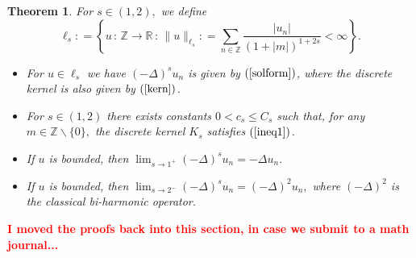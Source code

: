 \documentclass[final,1p,times]{elsarticle}
\def\ZZ{\mathbb Z} %
\def\RR{\mathbb R} %
\def\l{\left}
\def\r{\right}
\newcommand{\no}{\noindent}
\def\R#1{$(\ref{#1})$}
\newtheorem{theorem}{Theorem}
\theoremstyle{remark}
\theoremstyle{definition}
\newcommand{\josh}[1]{\textcolor{red}{\textbf{#1}}}
\begin{document}
\begin{theorem}
For $s\in (1,2),$ we define
$$\ell_{s}\mathrel{\mathop:}= \l\{u\,:\,\ZZ\to\RR\,:\,\|u\|_{\ell_{s}}\mathrel{\mathop:}= \sum_{n\in\ZZ}\frac{|u_n|}{(1+|m|)^{1+ 2s}}<\infty\r\}.$$
\begin{itemize}
\item[i.] For $u\in \ell_{s}$ we have $(-\Delta)^su_n$ is given by \R{solform}, where the discrete kernel is also given by \R{kern}.

\item[ii.] For $s\in (1,2)$ there exists constants $0 < c_s \le C_s$ such that, for any $m\in\ZZ\backslash\{0\},$ the discrete kernel $K_s$ satisfies \R{ineq1}.

\item[iii.] If $u$ is bounded, then $\lim_{s\to 1^+}(-\Delta)^s u_n = -\Delta u_n.$

\item[iv.] If $u$ is bounded, then $\lim_{s\to 2^-} (-\Delta)^s u_n = (-\Delta)^2 u_n,$ where $(-\Delta)^2$ is the classical {\em bi-harmonic operator}.
\end{itemize}
\end{theorem}

\no\josh{I moved the proofs back into this section, in case we submit to a math journal...}
\end{document}
